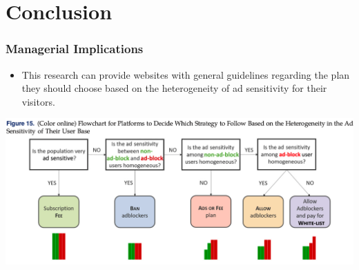 \documentclass{beamer}
\begin{document}
\section{Conclusion}
\begin{frame}[label=current]
    \frametitle{Managerial Implications}
    \begin{itemize}
        \item This research can provide websites with general guidelines regarding the plan
            they should choose based on the heterogeneity of ad sensitivity for their visitors.
    \end{itemize}
    \includegraphics[width=\textwidth]{flow}
\end{frame}

\begin{frame}[allowframebreaks]
    
\end{frame}

\end{document}
